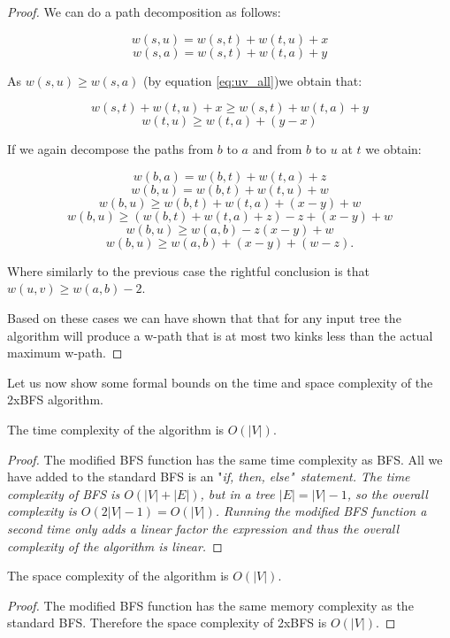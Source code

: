 \begin{proof}
We can do a path decomposition as follows:

$$ w(s, u) = w(s, t) + w(t, u) + x $$
$$ w(s, a) = w(s, t) + w(t, a) + y $$

As $w(s, u) \ge w(s, a)$ (by equation \ref{eq:uv_all})we obtain that:

$$ w(s, t) + w(t, u) + x  \ge w(s, t) + w(t, a) + y $$
$$ w(t, u) \ge w(t, a) + (y - x) $$

If we again decompose the paths from $b$ to $a$ and from $b$ to $u$ at $t$ we obtain:

$$ w(b, a) = w(b, t) + w(t, a) + z  $$
$$ w(b, u) = w(b, t) + w(t, u) + w  $$
$$ w(b, u) \ge w(b, t) + w(t, a) + (x - y) + w $$
$$ w(b, u) \ge (w(b, t) + w(t, a) + z) - z + (x - y) + w $$
$$ w(b, u) \ge w(a, b) - z (x - y) + w $$
$$ w(b, u) \ge w(a, b) + (x - y) + (w - z). $$

Where similarly to the previous case the rightful conclusion is that $ w(u, v) \ge w(a, b) - 2 $.

Based on these cases we can have shown that that for any input tree the algorithm will produce a w-path that is at most two kinks less than the actual maximum w-path.


\end{proof}

Let us now show some formal bounds on the time and space complexity of the 2xBFS algorithm.

\begin{lem} The time complexity of the algorithm is $O(|V|)$. \end{lem}

\begin{proof}
    The modified BFS function has the same time complexity as BFS. All we have added to the standard BFS is an "\em if, then, else\em"~statement. The time complexity of BFS is $O(|V| + |E|)$, but in a tree $|E| = |V| - 1$, so the overall complexity is $O(2|V| - 1) = O(|V|)$.
    Running the modified BFS function a second time only adds a linear factor the expression and thus the overall complexity of the algorithm is linear.
\end{proof}

\begin{lem} The space complexity of the algorithm is $O(|V|)$. \end{lem}

\begin{proof}
    The modified BFS function has the same memory complexity as the standard BFS. Therefore the space complexity of 2xBFS is $O(|V|)$.
\end{proof}

